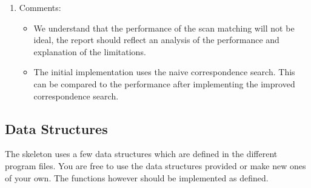 \documentclass[letta4 paper]{article}
\numberwithin{equation}{section}
\newcommand{\0}{\mathbf{0}}
\begin{document}
\begin{enumerate}
	 	\item Comments:
	 	\begin{itemize}
	 		\item We understand that the performance of the scan matching will not be ideal, the report should reflect an analysis of the performance and explanation of the limitations.
	 		\item The initial implementation uses the naive correspondence search. This can be compared to the performance after implementing the improved correspondence search.
	 	\end{itemize}
	 \end{enumerate}
	
	\subsection{Data Structures}
	The skeleton uses a few data structures which are defined in the different program files. You are free to use the data structures provided or make new ones of your own. The functions however should be implemented as defined.
	
\end{document}

